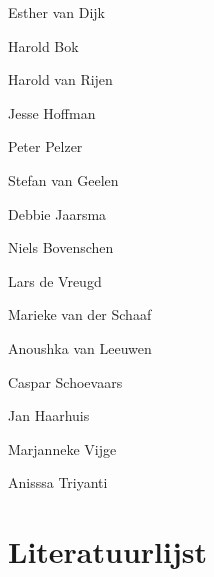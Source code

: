 \documentclass[smallauthor, chapterhaspagenum, nochapterinheader, pagenuminheader,  bigchapnum,medium2, tocpages, garamond, titleinheader]{jote-book}
\begin{document}
	\begin{references}


		Esther van Dijk

		Harold Bok



		Harold van Rijen



		Jesse Hoffman



		Peter Pelzer



		Stefan van Geelen



		Debbie Jaarsma



		Niels Bovenschen



		Lars de Vreugd



		Marieke van der Schaaf



		Anoushka van Leeuwen



		Caspar Schoevaars



		Jan Haarhuis



		Marjanneke Vijge



		Anisssa Triyanti


	\end{references}








	\chapter*{Literatuurlijst }

	\nochapterinheader
\end{document}
